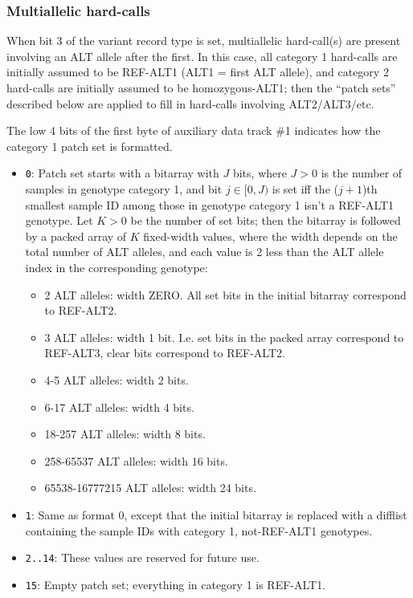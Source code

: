 \documentclass[8pt]{article}
\begin{document}
\subsubsection{Multiallelic hard-calls}

When bit 3 of the variant record type is set, multiallelic hard-call(s) are
present involving an ALT allele after the first.  In this case, all category 1
hard-calls are initially assumed to be REF-ALT1 (ALT1 = first ALT allele), and
category 2 hard-calls are initially assumed to be homozygous-ALT1; then the
``patch sets'' described below are applied to fill in hard-calls involving
ALT2/ALT3/etc.

The low 4 bits of the first byte of auxiliary data track \#1 indicates how the
category 1 patch set is formatted.

\begin{itemize}
\item \texttt{0}: Patch set starts with a bitarray with $J$ bits, where $J>0$
  is the number of samples in genotype category 1, and bit $j\in [0, J)$ is set
  iff the ($j+1$)th smallest sample ID among those in genotype category 1 isn't
  a REF-ALT1 genotype.  Let $K>0$ be the number of set bits; then the bitarray
  is followed by a packed array of $K$ fixed-width values, where the width
  depends on the total number of ALT alleles, and each value is 2 less than the
  ALT allele index in the corresponding genotype:
  \begin{itemize}
  \item 2 ALT alleles: width ZERO.  All set bits in the initial bitarray
    correspond to REF-ALT2.
  \item 3 ALT alleles: width 1 bit.  I.e. set bits in the packed array
    correspond to REF-ALT3, clear bits correspond to REF-ALT2.
  \item 4-5 ALT alleles: width 2 bits.
  \item 6-17 ALT alleles: width 4 bits.
  \item 18-257 ALT alleles: width 8 bits.
  \item 258-65537 ALT alleles: width 16 bits.
  \item 65538-16777215 ALT alleles: width 24 bits.
  \end{itemize}
\item \texttt{1}: Same as format 0, except that the initial bitarray is
  replaced with a difflist containing the sample IDs with category 1,
  not-REF-ALT1 genotypes.
\item \texttt{2..14}: These values are reserved for future use.
\item \texttt{15}: Empty patch set; everything in category 1 is REF-ALT1.
\end{itemize}
\end{document}
